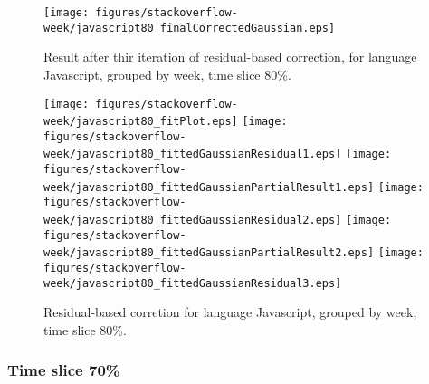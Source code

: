 \begin{figure}[]
\centering
{\texttt{[image: figures/stackoverflow-week/javascript80\_finalCorrectedGaussian.eps]}}
\caption{Result after thir iteration of residual-based correction, for language Javascript, grouped by week, time slice 80\%.}
\end{figure}


\begin{figure}[hb]
\centering
{}
{\texttt{[image: figures/stackoverflow-week/javascript80\_fitPlot.eps]}}
{\texttt{[image: figures/stackoverflow-week/javascript80\_fittedGaussianResidual1.eps]}}
{\texttt{[image: figures/stackoverflow-week/javascript80\_fittedGaussianPartialResult1.eps]}}
{\texttt{[image: figures/stackoverflow-week/javascript80\_fittedGaussianResidual2.eps]}}
{\texttt{[image: figures/stackoverflow-week/javascript80\_fittedGaussianPartialResult2.eps]}}
{\texttt{[image: figures/stackoverflow-week/javascript80\_fittedGaussianResidual3.eps]}}
\caption{Residual-based corretion for language Javascript, grouped by week, time slice 80\%.}
\end{figure}


\clearpage 
\newpage 


\FloatBarrier

\subsubsection{Time slice 70\%}

